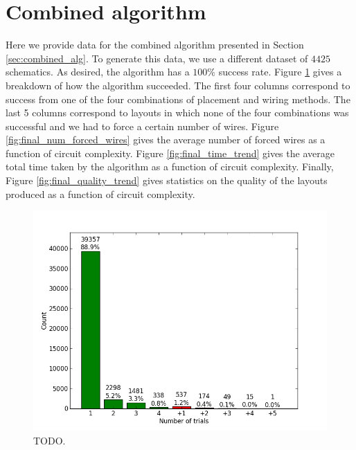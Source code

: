 \section{Combined algorithm}

Here we provide data for the combined algorithm presented in Section
\ref{sec:combined_alg}. To generate this data, we use a different dataset of
$4425$ schematics. As desired, the algorithm has a $100\%$ success rate.
Figure \ref{fig:final_num_trials} gives a breakdown of how the algorithm
succeeded. The first four columns correspond to success from one of the four
combinations of placement and wiring methods. The last 5 columns correspond to
layouts in which none of the four combinations was successful and we had to
force a certain number of wires. Figure \ref{fig:final_num_forced_wires} gives
the average number of forced wires as a function of circuit complexity. Figure
\ref{fig:final_time_trend} gives the average total time taken by the algorithm
as a function of circuit complexity. Finally, Figure \ref{fig:final_quality_trend}
gives statistics on the quality of the layouts produced as a function of circuit
complexity.

\begin{figure}[H]
\begin{center}
\includegraphics[width=\textwidth]{Images/final_algorithm_num_trials.png}
\caption{TODO.}
\label{fig:final_num_trials}
\end{center}
\end{figure}

